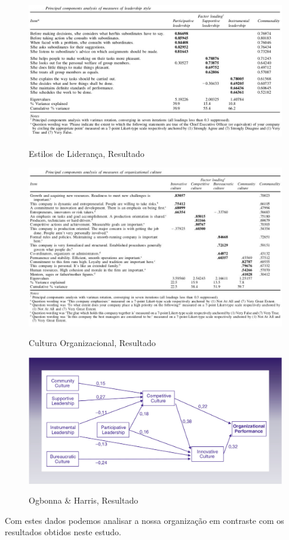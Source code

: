 {\newpage
\begin{figure}[H]
\centering
\includegraphics[scale=.5]{"./image/OB/Leadership.jpg"}\\
\caption{Estilos de Liderança, Resultado}
\label{grafico 1}
\end{figure}\par

\begin{figure}[H]
\centering
\includegraphics[scale=.6]{"./image/OB/Culture.jpg"}\\
\caption{Cultura Organizacional, Resultado}
\label{grafico 2}
\end{figure}\par

\newpage
\begin{figure}[H]
\centering
\includegraphics[scale=.35]{"./image/OB/Ogbonna & Harris.jpg"}\\
\caption{Ogbonna \& Harris, Resultado}
\label{grafico 3}
\end{figure}\par
Com estes dados podemos analisar a nossa organização em contraste com os resultados obtidos neste estudo.\\

}
